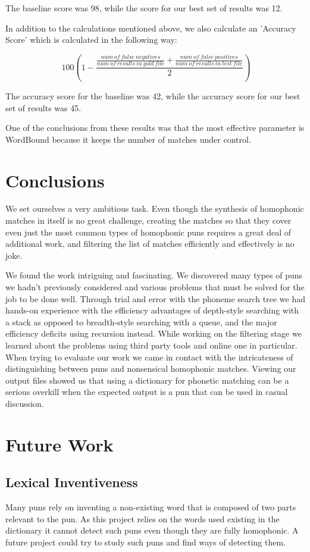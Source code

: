 \documentclass[11pt,a4paper]{article}
\begin{document}
The baseline score was 98, while the score for our best set of results was 12.

In addition to the calculations mentioned above, we also calculate an 'Accuracy Score' which is calculated in the following way:

\[\ 100(1 - \frac{\frac{num\:of\:false\:negatives}{num\:of\:results\:in\:gold\:file} + \frac{num\:of\:false\:positives}{num\:of\:results\:in\:test\:file}}{2})\]

The accuracy score for the baseline was 42, while the accuracy score for our best set of results was 45.

One of the conclusions from these results was that the most effective parameter is WordBound because it keeps the number of matches under control.

\section{Conclusions}

We set ourselves a very ambitious task. Even though the synthesis of homophonic matches in itself is no great challenge, creating the matches so that they cover even just the most common types of homophonic puns requires a great deal of additional work, and filtering the list of matches efficiently and effectively is no joke.

We found the work intriguing and fascinating. We discovered many types of puns we hadn't previously considered and various problems that must be solved for the job to be done well. Through trial and error with the phoneme search tree we had hands-on experience with the efficiency advantages of depth-style searching with a stack as opposed to breadth-style searching with a queue, and the major efficiency deficits using recursion instead. While working on the filtering stage we learned about the problems using third party tools and online one in particular. When trying to evaluate our work we came in contact with the intricateness of distinguishing between puns and nonsensical homophonic matches. Viewing our output files showed us that using a dictionary for phonetic matching can be a serious overkill when the expected output is a pun that can be used in casual discussion.

\section{Future Work}

\subsection{Lexical Inventiveness}
Many puns rely on inventing a non-existing word that is composed of two parts relevant to the pun. As this project relies on the words used existing in the dictionary it cannot detect such puns even though they are fully homophonic. A future project could try to study such puns and find ways of detecting them.
\end{document}
